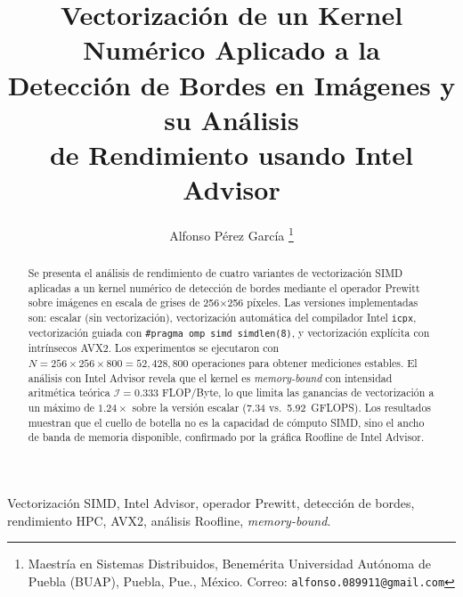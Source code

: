 \documentclass[twocolumn,twoside]{Jornadas}
\title{Vectorizaci\'on de un Kernel Num\'erico Aplicado a la\\
       Detecci\'on de Bordes en Im\'agenes y su An\'alisis\\
       de Rendimiento usando Intel Advisor}
\author{
  Alfonso P\'erez Garc\'ia%
  \thanks{Maestr\'ia en Sistemas Distribuidos,
          Benem\'erita Universidad Aut\'onoma de Puebla (BUAP),
          Puebla, Pue., M\'exico.
          Correo: \texttt{alfonso.089911@gmail.com}}
}
\let\origmathcal\mathcal
\renewcommand{\mathcal}[1]{{\origmathcal{#1}}}
\begin{document}
\maketitle
\markboth{}{}
\pagestyle{empty}
\thispagestyle{empty}

\begin{abstract}
Se presenta el an\'alisis de rendimiento de cuatro variantes de
vectorizaci\'on SIMD aplicadas a un kernel num\'erico de detecci\'on
de bordes mediante el operador Prewitt sobre im\'agenes en escala
de grises de 256$\times$256 p\'ixeles.
Las versiones implementadas son: escalar (sin vectorizaci\'on),
vectorizaci\'on autom\'atica del compilador Intel \texttt{icpx},
vectorizaci\'on guiada con \texttt{\#pragma omp simd simdlen(8)},
y vectorizaci\'on expl\'icita con intr\'insecos AVX2.
Los experimentos se ejecutaron con $N = 256 \times 256 \times 800 =
52{,}428{,}800$ operaciones para obtener mediciones estables.
El an\'alisis con Intel Advisor revela que el kernel es
\textit{memory-bound} con intensidad aritm\'etica te\'orica
$\mathcal{I} = 0.333$ FLOP/Byte, lo que limita las ganancias de
vectorizaci\'on a un m\'aximo de $1.24\times$ sobre la versi\'on escalar
(7.34 vs.\ 5.92~GFLOPS).
Los resultados muestran que el cuello de botella no es la capacidad
de c\'omputo SIMD, sino el ancho de banda de memoria disponible,
confirmado por la gr\'afica Roofline de Intel Advisor.
\end{abstract}

\begin{keywords}
  Vectorizaci\'on SIMD, Intel Advisor, operador Prewitt,
  detecci\'on de bordes, rendimiento HPC, AVX2, an\'alisis Roofline,
  \textit{memory-bound}.
\end{keywords}










\end{document}

